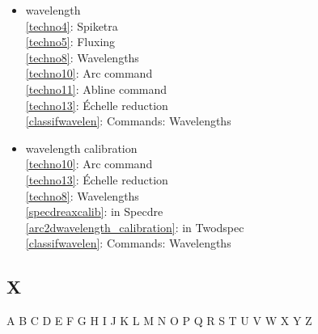 \documentclass[11pt,twoside]{article}
\newcommand{\htmlref}[2]{#1}
\newcommand{\idxint}[2]{\ref{#1}: \htmlref{#2}{#1}}
\newcommand{\idxint}[2]{\htmlref{#2}{#1}}
\begin{document}
\begin{itemize}
\item wavelength\\
   \idxint{techno4}{Spiketra}\\
   \idxint{techno5}{Fluxing}\\
   \idxint{techno8}{Wavelengths}\\
   \idxint{techno10}{Arc command}\\
   \idxint{techno11}{Abline command}\\
   \idxint{techno13}{\'Echelle reduction}\\
   \idxint{classifwavelen}{Commands: Wavelengths}
\item wavelength calibration\\
   \idxint{techno10}{Arc command}\\
   \idxint{techno13}{\'Echelle reduction}\\
   \idxint{techno8}{Wavelengths}\\
   \idxint{specdreaxcalib}{in Specdre}\\
   \idxint{arc2dwavelength_calibration}{in Twodspec}\\
   \idxint{classifwavelen}{Commands: Wavelengths}
\end{itemize}

\subsection*{\label{index_X}X}

\begin{htmlonly}
\htmlref{A}{index_A}
\htmlref{B}{index_B}
\htmlref{C}{index_C}
\htmlref{D}{index_D}
\htmlref{E}{index_E}
\htmlref{F}{index_F}
\htmlref{G}{index_G}
\htmlref{H}{index_H}
\htmlref{I}{index_I}
\htmlref{J}{index_J}
\htmlref{K}{index_K}
\htmlref{L}{index_L}
\htmlref{M}{index_M}
\htmlref{N}{index_N}
\htmlref{O}{index_O}
\htmlref{P}{index_P}
\htmlref{Q}{index_Q}
\htmlref{R}{index_R}
\htmlref{S}{index_S}
\htmlref{T}{index_T}
\htmlref{U}{index_U}
\htmlref{V}{index_V}
\htmlref{W}{index_W}
X
\htmlref{Y}{index_Y}
Z
\end{htmlonly}
\end{document}
